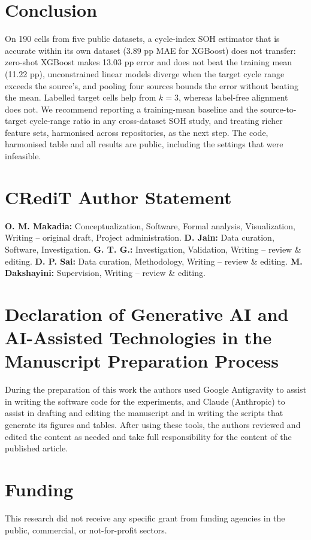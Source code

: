 \documentclass[journal]{IEEEtran}
\begin{document}
\section{Conclusion}
On 190 cells from five public datasets, a cycle-index SOH estimator that is accurate within its own dataset (3.89 pp MAE for XGBoost) does not transfer: zero-shot XGBoost makes 13.03 pp error and does not beat the training mean (11.22 pp), unconstrained linear models diverge when the target cycle range exceeds the source's, and pooling four sources bounds the error without beating the mean. Labelled target cells help from $k=3$, whereas label-free alignment does not. We recommend reporting a training-mean baseline and the source-to-target cycle-range ratio in any cross-dataset SOH study, and treating richer feature sets, harmonised across repositories, as the next step. The code, harmonised table and all results are public, including the settings that were infeasible.

\section*{CRediT Author Statement}
\textbf{O. M. Makadia:} Conceptualization, Software, Formal analysis, Visualization, Writing -- original draft, Project administration. \textbf{D. Jain:} Data curation, Software, Investigation. \textbf{G. T. G.:} Investigation, Validation, Writing -- review \& editing. \textbf{D. P. Sai:} Data curation, Methodology, Writing -- review \& editing. \textbf{M. Dakshayini:} Supervision, Writing -- review \& editing.

\section*{Declaration of Generative AI and AI-Assisted Technologies in the Manuscript Preparation Process}
During the preparation of this work the authors used Google Antigravity to assist in writing the software code for the experiments, and Claude (Anthropic) to assist in drafting and editing the manuscript and in writing the scripts that generate its figures and tables. After using these tools, the authors reviewed and edited the content as needed and take full responsibility for the content of the published article.

\section*{Funding}
This research did not receive any specific grant from funding agencies in the public, commercial, or not-for-profit sectors.
\end{document}
